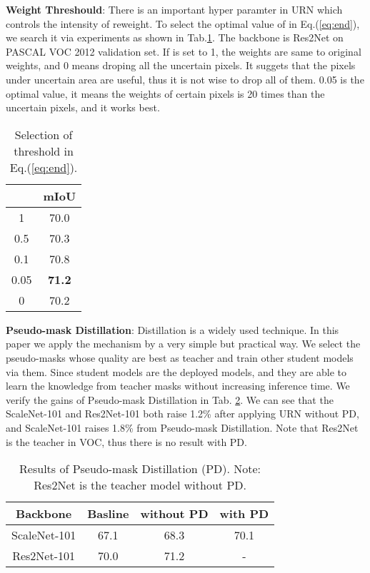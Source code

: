 \noindent \textbf{Weight Threshould}: There is an important hyper paramter in URN which controls the intensity of reweight. To select the optimal value of  in Eq.(\ref{eq:end}), we search it via experiments as shown in Tab.\ref{tab:thresh}. The backbone is Res2Net on PASCAL VOC 2012 validation set. If  is set to 1, the weights are same to original weights, and 0 means droping all the uncertain pixels. It suggets that the pixels under uncertain area are useful, thus it is not wise to drop all of them. 0.05 is the optimal value, it means the weights of certain pixels is 20 times than the uncertain pixels, and it works best.
\begin{table}[htb]
\begin{centering}
\setlength\tabcolsep{15pt}
\begin{tabular}{cc}
\hline
  & mIoU\tabularnewline
\hline
\hline
1  & 70.0\tabularnewline
0.5  & 70.3\tabularnewline
0.1  & 70.8\tabularnewline
0.05  & \textbf{71.2}\tabularnewline
0  & 70.2\tabularnewline
\hline
\end{tabular}
\par\end{centering}
\caption{\label{tab:baseline}Selection of threshold  in Eq.(\ref{eq:end}).}
\label{tab:thresh}
\end{table}

\noindent \textbf{Pseudo-mask Distillation}:
Distillation is a widely used technique. In this paper we apply the mechanism by a very simple but practical way. We select the pseudo-masks whose quality are best as teacher and train other student models via them. Since student models are the deployed models, and they are able to learn the knowledge from teacher masks without increasing inference time. We verify the gains of Pseudo-mask Distillation in Tab. \ref{tab:distill}. We can see that the ScaleNet-101 and Res2Net-101 both raise 1.2\% after applying URN without PD, and ScaleNet-101 raises 1.8\% from Pseudo-mask Distillation. Note that Res2Net is the teacher in VOC, thus there is no result with PD. 
\begin{table}[t]
\begin{centering}
\setlength\tabcolsep{10pt}
\begin{tabular}{cccc}
\hline 
Backbone  & Basline & without PD  & with PD\tabularnewline
\hline 
\hline 
ScaleNet-101  & 67.1  & 68.3 & 70.1\tabularnewline
Res2Net-101  & 70.0  & 71.2 & -\tabularnewline
\hline 
\end{tabular}
\par\end{centering}
\caption{\label{tab:distill}Results of Pseudo-mask Distillation (PD). Note: Res2Net is the teacher model without PD.}
\end{table}

